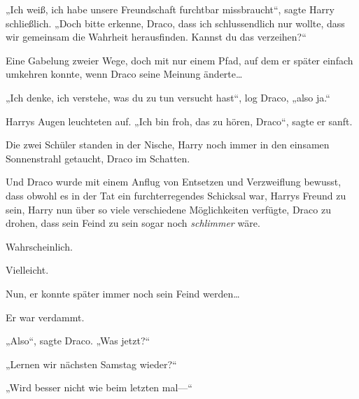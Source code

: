 „Ich weiß, ich habe unsere Freundschaft furchtbar missbraucht“, sagte Harry schließlich. „Doch bitte erkenne, Draco, dass ich schlussendlich nur wollte, dass wir gemeinsam die Wahrheit herausfinden. Kannst du das verzeihen?“

Eine Gabelung zweier Wege, doch mit nur einem Pfad, auf dem er später einfach umkehren konnte, wenn Draco seine Meinung änderte…

„Ich denke, ich verstehe, was du zu tun versucht hast“, log Draco, „also ja.“

Harrys Augen leuchteten auf. „Ich bin froh, das zu hören, Draco“, sagte er sanft.

Die zwei Schüler standen in der Nische, Harry noch immer in den einsamen Sonnenstrahl getaucht, Draco im Schatten.

Und Draco wurde mit einem Anflug von Entsetzen und Verzweiflung bewusst, dass obwohl es in der Tat ein furchterregendes Schicksal war, Harrys Freund zu sein, Harry nun über so viele verschiedene Möglichkeiten verfügte, Draco zu drohen, dass sein Feind zu sein sogar noch \emph{schlimmer} wäre.

Wahrscheinlich.

Vielleicht.

Nun, er konnte später immer noch sein Feind werden…

Er war verdammt.

„Also“, sagte Draco. „Was jetzt?“

„Lernen wir nächsten Samstag wieder?“

„Wird besser nicht wie beim letzten mal—“

